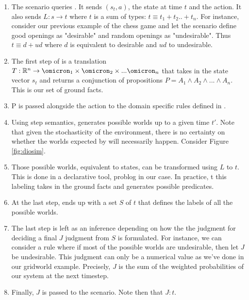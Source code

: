 \begin{enumerate}
  \item The scenario queries \dio{}. It sends $(s_t, a)$, the state at time $t$ and the action. It also sends $L : s \rightarrow t$ where $t$ is a sum of types: 
        $t \equiv t_1 + t_2 .. + t_n$. For instance, consider our previous example of the chess game and let the scenario define good openings as "desirable" and random openings as 
        "undesirable". Thus $t \equiv d + ud$ where $d$ is equivalent to desirable and $ud$ to undesirable. 
  \item The first step of \dio{} is a translation $T : \mathbb{R}^n
  \rightarrow \omicron_1 \times \omicron_2 \times ... \omicron_n$ that takes in the state
  vector $s_t$ and returns a conjunction of propositions $P = A_1 \wedge
  A_2 \wedge ... \wedge A_n$. This is our set of ground facts.
  \item P is passed alongside the action to the domain specific rules defined in \dio{}. 
  \item Using step semantics, \dio{} generates possible worlds up to a given time $t'$. Note that given the stochasticity of the environment, there is no certainty on
        whether the worlds expected by \dio{} will necessarily happen. Consider Figure \ref{fig:diosim}.
  \item Those possible worlds, equivalent to states, can be
  transformed using $L$ to $t$. This is done in a declarative tool, problog in our case. In practice, t
  this labeling takes in the ground facts and generates possible predicates. 
  \item At the last step, \dio{} ends up with a set $S$ of $t$ that defines the labels of all the possible worlds.
  \item The last step is left as an inference depending on how the the judgment for deciding a final $J$ judgment from $S$ 
        is formulated. For instance, we can consider a rule where if most of the possible worlds are undesirable, then let $J$ be undesirable.
        This judgment can only be a numerical value as we've done in our gridworld example. Precisely, $J$ is the sum of the weighted probabilities of our system at the next 
        timestep.
  \item Finally, $J$ is passed to the scenario. Note then that $J : t$. 
\end{enumerate}

